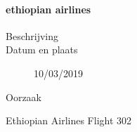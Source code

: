 
 


\paragraph{ethiopian airlines}

\begin{description}
\item[Beschrijving]
\item[Datum en plaats] 10/03/2019
\item[Oorzaak]
\end{description}
Ethiopian Airlines Flight 302



